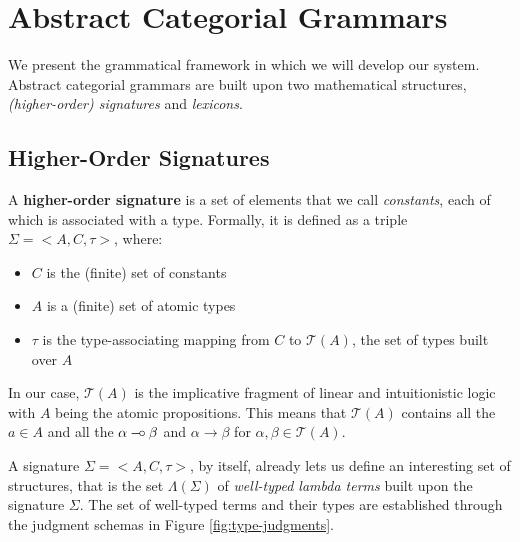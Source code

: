 \section{Abstract Categorial Grammars}
\label{sec:acg}

We present the grammatical framework in which we will develop our
system. Abstract categorial grammars are built upon two mathematical
structures, \emph{(higher-order) signatures} and \emph{lexicons}.

\subsection{Higher-Order Signatures}
\label{ssec:sig}

A \textbf{higher-order signature} is a set of elements that we call
\emph{constants}, each of which is associated with a type. Formally, it
is defined as a triple $\Sigma = \mathopen{<}A, C, \tau\mathclose{>}$,
where:
\begin{itemize}
  \item $C$ is the (finite) set of constants
  \item $A$ is a (finite) set of atomic types
  \item $\tau$ is the type-associating mapping from $C$ to
    $\mathcal{T}(A)$, the set of types built over $A$
\end{itemize}

In our case, $\mathcal{T}(A)$ is the implicative fragment of linear and
intuitionistic logic with $A$ being the atomic propositions. This means
that $\mathcal{T}(A)$ contains all the $a \in A$ and all the $\alpha \mathbin{{-}\mkern-3.5mu{\circ}}
\beta$ and $\alpha \to \beta$ for $\alpha, \beta \in \mathcal{T}(A)$.

A signature $\Sigma = \mathopen{<}A, C, \tau\mathclose{>}$, by itself,
already lets us define an interesting set of structures, that is the set
$\Lambda(\Sigma)$ of \emph{well-typed lambda terms} built upon the
signature $\Sigma$. The set of well-typed terms and their types are
established through the judgment schemas in Figure
\ref{fig:type-judgments}.

